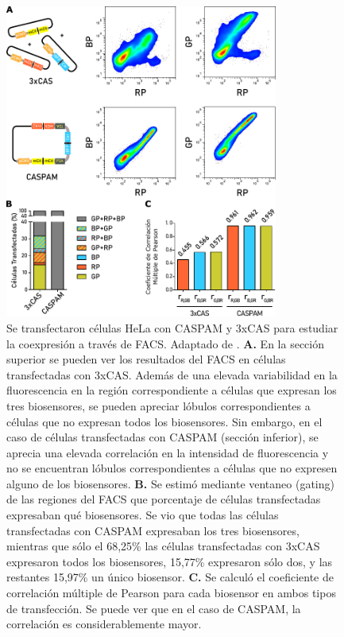 \begin{figure}[t!]
    \centering
    \includegraphics[width=0.8\textwidth]{img/cap_3/FACS.pdf}
    \caption{\footnotesize{Se transfectaron células HeLa con CASPAM y 3xCAS para estudiar la coexpresión a través de FACS. Adaptado de \cite{Habif2021}. \textbf{A.} En la sección superior se pueden ver los resultados del FACS en células transfectadas con 3xCAS. Además de una elevada variabilidad en la fluorescencia en la región correspondiente a células que expresan los tres biosensores, se pueden apreciar lóbulos correspondientes a células que no expresan todos los biosensores. Sin embargo, en el caso de células transfectadas con CASPAM (sección inferior), se aprecia una elevada correlación en la intensidad de fluorescencia y no se encuentran lóbulos correspondientes a células que no expresen alguno de los biosensores. \textbf{B.} Se estimó mediante ventaneo (gating) de las regiones del FACS que porcentaje de células transfectadas expresaban qué biosensores. Se vio que todas las células transfectadas con CASPAM expresaban los tres biosensores, mientras que sólo el 68,25\% las células transfectadas con 3xCAS expresaron todos los biosensores, 15,77\% expresaron sólo dos, y las restantes 15,97\% un único biosensor. \textbf{C.} Se calculó el coeficiente de correlación múltiple de Pearson para cada biosensor en ambos tipos de transfección. Se puede ver que en el caso de CASPAM, la correlación es considerablemente mayor.}}
    \label{fig:FACS}
\end{figure}


